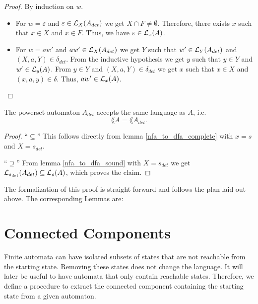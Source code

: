 \begin{proof}
    By induction on $w$. %
    \begin{itemize}
        \item
            For $w = \varepsilon$ and $\varepsilon \in \mathcal{L}_{X}(A_{det})$ we get  $X \cap F \neq \emptyset$.
            Therefore, there exists $x$ such that $x \in X$ and $x \in F$.
            Thus, we have $\varepsilon \in \mathcal{L}_{x}(A)$.
        \item
            For $w = a w'$ and $a w' \in \mathcal{L}_{X}(A_{det})$ we get $Y$ such that $w' \in \mathcal{L}_{Y}(A_{det})$ and $(X,a,Y) \in \delta_{det}$.
            From the inductive hypothesis we get $y$ such that $y \in Y$ and $w' \in \mathcal{L}_{y}(A)$.
            From $y \in Y$ and $(X, a, Y) \in \delta_{det}$ we get $x$ such that $x \in X$ and $(x, a, y) \in \delta$.
            Thus, $a w' \in \mathcal{L}_{x}(A)$.
    \end{itemize}
\end{proof}

\begin{theorem}
    The powerset automaton $A_{det}$ accepts the same language as $A$, i.e.
    \begin{equation*}        
        \lang{A} = \lang{A_{det}}.        
    \end{equation*}
\end{theorem}
\begin{proof}
    ``$\subseteq$'' 
    This follows directly from lemma \ref{nfa_to_dfa_complete} with $x = s$ and $X = {s}_{det}$.

    ``$\supseteq$''
    From lemma \ref{nfa_to_dfa_sound} with $X = {s}_{det}$ we get 
    $\mathcal{L}_{s_{det}}(A_{det}) \subseteq \mathcal{L}_{s}(A)$, which proves the claim.
\end{proof}


The formalization of this proof is straight-forward and follows the plan laid out above. 
The corresponding Lemmas are:


\section{Connected Components}
 
Finite automata can have isolated subsets of states that are not reachable from the starting state. 
Removing these states does not change the language.
It will later be useful to have automata that only contain reachable states. 
Therefore, we define a procedure to extract the connected component containing the starting state from a given automaton.

